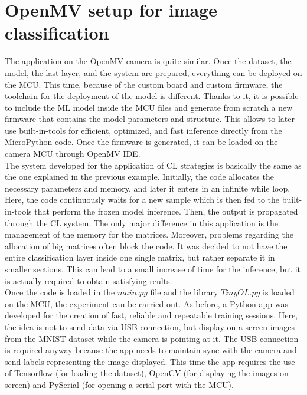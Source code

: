 \documentclass[12pt]{report}
\begin{document}
\section{OpenMV setup for image classification}
The application on the OpenMV camera is quite similar. Once the dataset, the model, the last layer, and the system are prepared, everything can be deployed on the MCU. This time, because of the custom board and custom firmware, the toolchain for the deployment of the model is different. Thanks to it, it is possible to include the ML model inside the MCU files and generate from scratch a new firmware that contains the model parameters and structure. This allows to later use built-in-tools for efficient, optimized, and fast inference directly from the MicroPython code. Once the firmware is generated, it can be loaded on the camera MCU through OpenMV IDE.\\
The system developed for the application of CL strategies is basically the same as the one explained in the previous example. Initially, the code allocates the necessary parameters and memory, and later it enters in an infinite while loop. Here, the code continuously waits for a new sample which is then fed to the built-in-tools that perform the frozen model inference. Then, the output is propagated through the CL system. The only major difference in this application is the management of the memory for the matrices. Moreover, problems regarding the allocation of big matrices often block the code. It was decided to not have the entire classification layer inside one single matrix, but rather separate it in smaller sections. This can lead to a small increase of time for the inference, but it is actually required to obtain satisfying reults. \\
Once the code is loaded in the $main.py$ file and the library $TinyOL.py$ is loaded on the MCU, the experiment can be carried out. As before, a Python app was developed for the creation of fast, reliable and repeatable training sessions. Here, the idea is not to send data via USB connection, but display on a screen images from the MNIST dataset while the camera is pointing at it. The USB connection is required anyway because the app needs to maintain sync with the camera and send labels representing the image displayed. This time the app requires the use of Tensorflow (for loading the dataset), OpenCV (for displaying the images on screen) and PySerial (for opening a serial port with the MCU). \\
\end{document}
